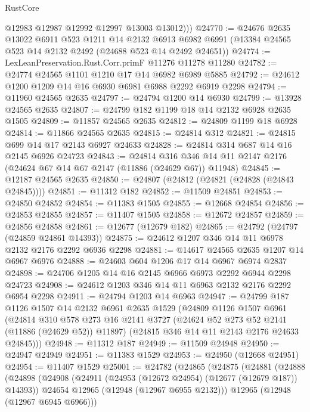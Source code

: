 \begin{lexlean}{RustCore}
\begin{coremodule}
          @12983
          @12987
          @12992
          @12997
          @13003
          @13012)))
@24770 := @24676
    @2635
    @13022
    @6911
    @523
    @1211
    @14
    @2132
    @6913
    @6982
    @6991
    (@13384 @24565 @523 @14 @2132 @2492 (@24688 @523 @14 @2492 @24651))
@24774 := LexLeanPreservation.Rust.Corr.primF @11276 @11278 @11280
@24782 := @24774 @24565 @1101 @1210 @17 @14 @6982 @6989 @5885
@24792 := @24612 @1200 @1209 @14 @16 @6930 @6981 @6988 @2292 @6919 @2298
@24794 := @11960 @24565 @2635
@24797 := @24794 @1200 @14 @6930
@24799 := @13928 @24565 @2635
@24807 := @24799 @182 @1199 @18 @14 @2132 @6928 @2635 @1505
@24809 := @11857 @24565 @2635
@24812 := @24809 @1199 @18 @6928
@24814 := @11866 @24565 @2635
@24815 := @24814 @312
@24821 := @24815 @699 @14 @17 @2143 @6927 @24633
@24828 := @24814 @314 @687 @14 @16 @2145 @6926 @24723
@24843 := @24814
    @316
    @346
    @14
    @11
    @2147
    @2176
    (@24624 @67 @14 @67 @2147 (@11886 (@24629 @67)) @11948)
@24845 := @12187 @24565 @2635
@24850 := @24807 (@24812 (@24821 (@24828 (@24843 @24845))))
@24851 := @11312 @182
@24852 := @11509 @24851
@24853 := @24850 @24852
@24854 := @11383 @1505
@24855 := @12668 @24854
@24856 := @24853 @24855
@24857 := @11407 @1505
@24858 := @12672 @24857
@24859 := @24856 @24858
@24861 := @12677 (@12679 @182)
@24865 := @24792 (@24797 (@24859 @24861 @14393))
@24875 := @24612 @1207 @346 @14 @11 @6978 @2132 @2176 @2292 @6936 @2298
@24881 := @14617 @24565 @2635 @1207 @14 @6967 @6976
@24888 := @24603 @604 @1206 @17 @14 @6967 @6974 @2837
@24898 := @24706 @1205 @14 @16 @2145 @6966 @6973 @2292 @6944 @2298 @24723
@24908 := @24612 @1203 @346 @14 @11 @6963 @2132 @2176 @2292 @6954 @2298
@24911 := @24794 @1203 @14 @6963
@24947 := @24799
    @187
    @1126
    @1507
    @14
    @2132
    @6961
    @2635
    @1529
    (@24809
      @1126
      @1507
      @6961
      (@24814
        @310
        @578
        @273
        @16
        @2141
        @3727
        (@24624 @52 @273 @52 @2141 (@11886 (@24629 @52)) @11897)
        (@24815 @346 @14 @11 @2143 @2176 @24633 @24845)))
@24948 := @11312 @187
@24949 := @11509 @24948
@24950 := @24947 @24949
@24951 := @11383 @1529
@24953 := @24950 (@12668 @24951)
@24954 := @11407 @1529
@25001 := @24782
    (@24865
      (@24875
        (@24881
          (@24888
            (@24898
              (@24908
                (@24911 (@24953 (@12672 @24954) (@12677 (@12679 @187)) @14393))
                @24654
                @12965
                (@12948 (@12967 @6955 @2132)))
              @12965
              (@12948 (@12967 @6945 @6966)))

\end{coremodule}
\end{lexlean}
